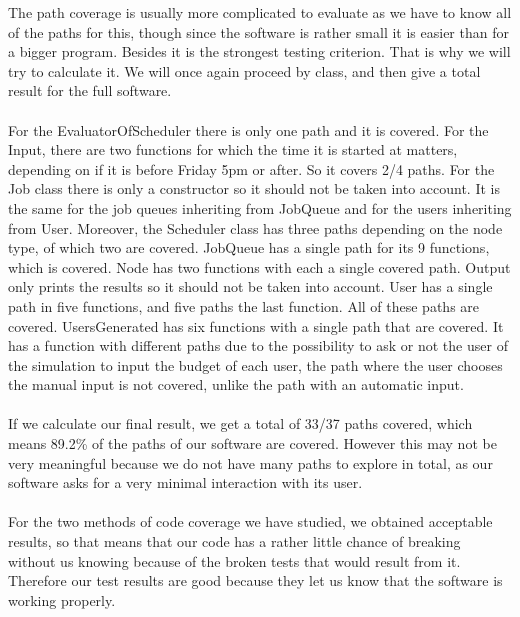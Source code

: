 \documentclass [10 pt, a4 paper]{report}
\begin{document}
The path coverage is usually more complicated to evaluate as we have to know all of the paths for this, though since the software is rather small it is easier than for a bigger program. Besides it is the strongest testing criterion. That is why we will try to calculate it. We will once again proceed by class, and then give a total result for the full software.
\\ \\
For the EvaluatorOfScheduler there is only one path and it is covered. For the Input, there are two functions for which the time it is started at matters, depending on if it is before Friday 5pm or after. So it covers 2/4 paths. For the Job class there is only a constructor so it should not be taken into account. It is the same for the job queues inheriting from JobQueue and for the users inheriting from User. Moreover, the Scheduler class has three paths depending on the node type, of which two are covered. JobQueue has a single path for its 9 functions, which is covered. Node has two functions with each a single covered path. Output only prints the results so it should not be taken into account. User has a single path in five functions, and five paths the last function. All of these paths are covered. UsersGenerated has six functions with a single path that are covered. It has a function with different paths due to the possibility to ask or not the user of the simulation to input the budget of each user, the path where the user chooses the manual input is not covered, unlike the path with an automatic input.
\\ \\
If we calculate our final result, we get a total of 33/37 paths covered, which means 89.2\% of the paths of our software are covered. However this may not be very meaningful because we do not have many paths to explore in total, as our software asks for a very minimal interaction with its user.
\\ \\
For the two methods of code coverage we have studied, we obtained acceptable results, so that means that our code has a rather little chance of breaking without us knowing because of the broken tests that would result from it. Therefore our test results are good because they let us know that the software is working properly.
\end{document}
